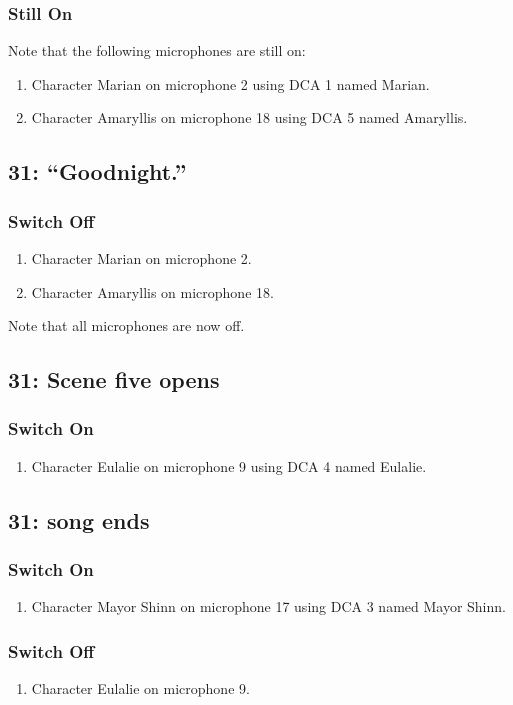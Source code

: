 \subsubsection* {Still On}
Note that the following microphones are still on:
\begin{enumerate}
\item Character Marian on microphone 2 using DCA 1 named Marian.
\item Character Amaryllis on microphone 18 using DCA 5 named Amaryllis.
\end{enumerate}
\subsection* {31: ``Goodnight.''}
\subsubsection* {Switch Off}
\begin{enumerate}
\item Character Marian on microphone 2.
\item Character Amaryllis on microphone 18.
\end{enumerate}
Note that all microphones are now off.
\subsection* {31: Scene five opens}
\subsubsection* {Switch On}
\begin{enumerate}
\item Character Eulalie on microphone 9 using DCA 4 named Eulalie.
\end{enumerate}
\subsection* {31: song ends}
\subsubsection* {Switch On}
\begin{enumerate}
\item Character Mayor Shinn on microphone 17 using DCA 3 named Mayor Shinn.
\end{enumerate}
\subsubsection* {Switch Off}
\begin{enumerate}
\item Character Eulalie on microphone 9.
\end{enumerate}

